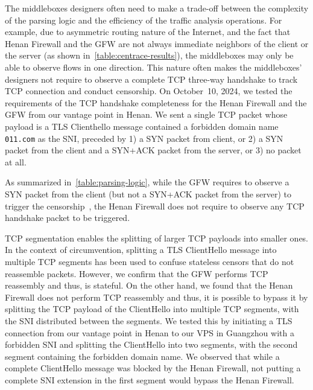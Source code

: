 \documentclass[conference,compsoc]{IEEEtran}
\begin{document}
The middleboxes designers often need to make a trade-off
between the complexity of the parsing logic
and the efficiency of the traffic analysis operations.
For example,
due to asymmetric routing nature of the Internet,
and the fact that Henan Firewall and the GFW are not always immediate neighbors of the client or the server (as shown in~\autoref{table:centrace-results}),
the middleboxes may only be able to observe flows in one direction.
This nature often makes the middleboxes' designers not require to observe a complete TCP three-way handshake
to track TCP connection and conduct censorship.
On October~10, 2024,
we tested the requirements of the TCP handshake completeness for the Henan Firewall and the GFW from our vantage point in Henan.
We sent a single TCP packet whose payload is a TLS Clienthello message contained a forbidden domain name \texttt{011.com} as the SNI,
preceded by 1) a SYN packet from client, or 2) a SYN packet from the client and a SYN+ACK packet from the server, or 3) no packet at all.

As summarized in~\autoref{table:parsing-logic},
while the GFW requires to observe a SYN packet from the client (but not a SYN+ACK packet from the server)
to trigger the censorship~\cite{Hoang2024a},
the Henan Firewall does not require to observe any TCP handshake packet to be triggered.

TCP segmentation enables the splitting of larger TCP payloads into smaller ones.
In the context of circumvention, splitting a TLS ClientHello message into multiple TCP segments
has been used to confuse stateless censors that do not reassemble packets.
However, we confirm that the GFW performs TCP reassembly and thus, is stateful.
On the other hand, we found that the Henan Firewall does not perform TCP reassembly and thus,
it is possible to bypass it by splitting the TCP payload of the ClientHello into multiple TCP segments,
with the SNI distributed between the segments.
We tested this by initiating a TLS connection from our vantage point in Henan to our VPS in Guangzhou
with a forbidden SNI and splitting the ClientHello into two segments,
with the second segment containing the forbidden domain name.
We observed that while a complete ClientHello message was blocked by the Henan Firewall,
not putting a complete SNI extension in the first segment would bypass the Henan Firewall.
\end{document}
